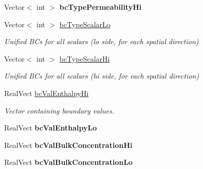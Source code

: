 \begin{DoxyCompactItemize}
\item 
\hypertarget{class_mushy_layer_params_a5b6fae7451c1f563711f732308058d0c}{Vector$<$ int $>$ {\bfseries bc\-Type\-Permeability\-Hi}}\label{class_mushy_layer_params_a5b6fae7451c1f563711f732308058d0c}

\item 
\hypertarget{class_mushy_layer_params_a9f6c79192f3543f76536ee658717dd9c}{Vector$<$ int $>$ \hyperlink{class_mushy_layer_params_a9f6c79192f3543f76536ee658717dd9c}{bc\-Type\-Scalar\-Lo}}\label{class_mushy_layer_params_a9f6c79192f3543f76536ee658717dd9c}

\begin{DoxyCompactList}\small\item\em Unified B\-Cs for all scalars (lo side, for each spatial direction) \end{DoxyCompactList}\item 
\hypertarget{class_mushy_layer_params_a0967dab260886cd49012d03cd38bb0fd}{Vector$<$ int $>$ \hyperlink{class_mushy_layer_params_a0967dab260886cd49012d03cd38bb0fd}{bc\-Type\-Scalar\-Hi}}\label{class_mushy_layer_params_a0967dab260886cd49012d03cd38bb0fd}

\begin{DoxyCompactList}\small\item\em Unified B\-Cs for all scalars (hi side, for each spatial direction) \end{DoxyCompactList}\item 
\hypertarget{class_mushy_layer_params_a54544cff481fc73b80114133caeb08f4}{Real\-Vect \hyperlink{class_mushy_layer_params_a54544cff481fc73b80114133caeb08f4}{bc\-Val\-Enthalpy\-Hi}}\label{class_mushy_layer_params_a54544cff481fc73b80114133caeb08f4}

\begin{DoxyCompactList}\small\item\em Vector containing boundary values. \end{DoxyCompactList}\item 
\hypertarget{class_mushy_layer_params_a7c6879d90958f9798389e497779cecbc}{Real\-Vect {\bfseries bc\-Val\-Enthalpy\-Lo}}\label{class_mushy_layer_params_a7c6879d90958f9798389e497779cecbc}

\item 
\hypertarget{class_mushy_layer_params_a10f2afe241fb5442559ae32da03ace73}{Real\-Vect {\bfseries bc\-Val\-Bulk\-Concentration\-Hi}}\label{class_mushy_layer_params_a10f2afe241fb5442559ae32da03ace73}

\item 
\hypertarget{class_mushy_layer_params_a06f2d284d0ad84792bc599a7cdf540e7}{Real\-Vect {\bfseries bc\-Val\-Bulk\-Concentration\-Lo}}\label{class_mushy_layer_params_a06f2d284d0ad84792bc599a7cdf540e7}


\end{DoxyCompactItemize}
